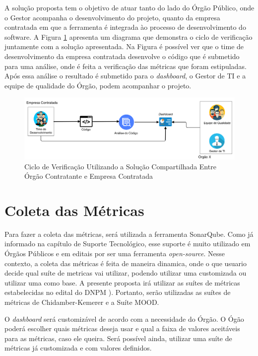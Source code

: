 A solução proposta tem o objetivo de atuar tanto do lado do Órgão Público, onde o Gestor acompanha o desenvolvimento do projeto, quanto da empresa contratada em que a ferramenta é integrada ào processo de desenvolvimento do software. A Figura \ref{img:ciclo_ver} apresenta um diagrama que demonstra o ciclo de verificação juntamente com a solução apresentada. Na Figura é possível ver que o time de desenvolvimento da empresa contratada desenvolve o código que é submetido para uma análise, onde é feita a verificação das métricas que foram estipuladas. Após essa análise o resultado é submetido para o \textit{dashboard},  o Gestor de TI e a equipe de qualidade do Órgão, podem acompanhar o projeto.

\graphicspath{{figuras/}}
\begin{figure}[h!]
\centering
\includegraphics[scale=0.30]{proc_ver.png}
\caption{Ciclo de Verificação Utilizando a Solução Compartilhada Entre Órgão Contratante e Empresa Contratada}
\label{img:ciclo_ver}
\end{figure}


\section{Coleta das Métricas}
Para fazer a coleta das métricas, será utilizada a ferramenta SonarQube. Como já informado na capítulo de Suporte Tecnológico, esse suporte é muito utilizado em Órgãos Públicos e em editais por ser uma ferramenta \textit{open-source}. Nesse contexto, a coleta das métricas é feita de maneira dinamica, onde o que usuario decide qual suíte de metricas vai utilizar, podendo utilizar uma customizada ou utilizar uma como base. A presente proposta irá utilizar as suítes de métricas estabelecidas no edital do DNPM \cite{edital}). Portanto, serão utilizadas as suítes de métricas de Chidamber-Kemerer e a Suíte MOOD.

O \textit{dashboard} será customizável de acordo com a necessidade do Órgão. O Ógão poderá escolher quais métricas deseja usar e qual a faixa de valores aceitáveis para as métricas, caso ele queira. Será possível ainda, utilizar uma suíte de métricas já customizada e com valores definidos. 

